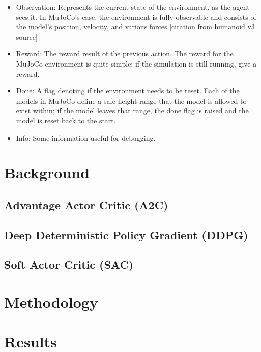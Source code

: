 \documentclass[conference]{IEEEtran}
\begin{document}
\begin{itemize}
    \item Observation: Represents the current state of the environment, as the agent sees it. In MuJoCo's case, the
    environment is fully observable and consists of the model's position, velocity, and various forces [citation from humanoid v3 source]
    \item Reward: The reward result of the previous action. The reward for the MuJoCo environment is quite simple: if
    the simulation is still running, give a reward.
    \item Done: A flag denoting if the environment needs to be reset. Each of the models in MuJoCo define a safe height
    range that the model is allowed to exist within; if the model leaves that range, the done flag is raised and the
    model is reset back to the start.
    \item Info: Some information useful for debugging.
\end{itemize}

\section{Background}

\blindtext

\subsection{Advantage Actor Critic (A2C)}

\blindtext

\subsection{Deep Deterministic Policy Gradient (DDPG)}

\blindtext

\subsection{Soft Actor Critic (SAC)}

\blindtext

\section{Methodology}



\section{Results}
\end{document}
